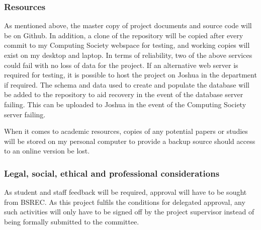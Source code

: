 \subsubsection*{Resources}
As mentioned above, the master copy of project documents and source code will be on Github. In addition, a clone of the repository will be copied after every commit to my Computing Society webspace for testing, and working copies will exist on my desktop and laptop. In terms of reliability, two of the above services could fail with no loss of data for the project. If an alternative web server is required for testing, it is possible to host the project on Joshua in the department if required. The schema and data used to create and populate the database will be added to the repository to aid recovery in the event of the database server failing. This can be uploaded to Joshua in the event of the Computing Society server failing.

When it comes to academic resources, copies of any potential papers or studies will be stored on my personal computer to provide a backup source should access to an online version be lost.
\subsubsection*{Legal, social, ethical and professional considerations}
As student and staff feedback will be required, approval will have to be sought from BSREC. As this project fulfils the conditions for delegated approval, any such activities will only have to be signed off by the project supervisor instead of being formally submitted to the committee.